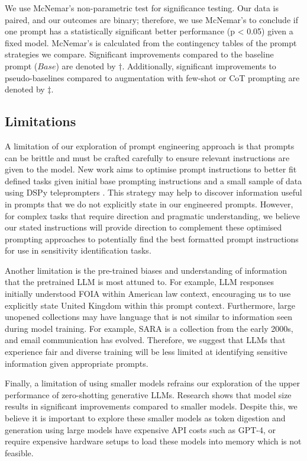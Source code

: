 We use McNemar’s non-parametric test \cite{mcnemar1947note} for significance testing. Our data is paired, and our outcomes are binary; therefore, we use McNemar’s to conclude if one prompt has a statistically significant better performance (p < 0.05) given a fixed model. McNemar’s is calculated from the contingency tables of the prompt strategies we compare. Significant improvements compared to the baseline prompt ($Base$) are denoted by $\dagger$. Additionally, significant improvements to pseudo-baselines compared to augmentation with few-shot or CoT prompting are denoted by $\ddagger$.

\subsection{Limitations}
A limitation of our exploration of prompt engineering approach is that prompts can be brittle and must be crafted carefully to ensure relevant instructions are given to the model. New work aims to optimise prompt instructions to better fit defined tasks given initial base prompting instructions and a small sample of data using DSPy teleprompters \cite{}. This strategy may help to discover information useful in prompts that we do not explicitly state in our engineered prompts. However, for complex tasks that require direction and pragmatic understanding, we believe our stated instructions will provide direction to complement these optimised prompting approaches to potentially find the best formatted prompt instructions for use in sensitivity identification tasks.

Another limitation is the pre-trained biases and understanding of information that the pretrained LLM is most attuned to. For example, LLM responses initially understood FOIA within American law context, encouraging us to use explicitly state United Kingdom within this prompt context. Furthermore, large unopened collections may have language that is not similar to information seen during model training. For example, SARA is a collection from the early 2000s, and email communication has evolved. Therefore, we suggest that LLMs that experience fair and diverse training will be less limited at identifying sensitive information given appropriate prompts.

Finally, a limitation of using smaller models refrains our exploration of the upper performance of zero-shotting generative LLMs. Research shows that model size results in significant improvements compared to smaller models. Despite this, we believe it is important to explore these smaller models as token digestion and generation using large models have expensive API costs such as GPT-4, or require expensive hardware setups to load these models into memory which is not feasible.
